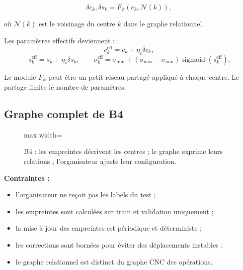 \documentclass[11pt,a4paper]{article}
\begin{document}
\[
\delta c_k,\delta s_k
=
F_\psi(e_k,\mathcal{N}(k)),
\]

où \(\mathcal{N}(k)\) est le voisinage du centre \(k\) dans le graphe
relationnel.

Les paramètres effectifs deviennent :
\[
c_k^{\mathrm{eff}}=c_k+\eta_c\delta c_k,
\]
\[
s_k^{\mathrm{eff}}=s_k+\eta_s\delta s_k,
\qquad
\sigma_k^{\mathrm{eff}}
=\sigma_{\min}
+(\sigma_{\max}-\sigma_{\min})
\operatorname{sigmoid}(s_k^{\mathrm{eff}}).
\]

Le module \(F_\psi\) peut être un petit réseau partagé appliqué
à chaque centre. Le partage limite le nombre de paramètres.

\subsection{Graphe complet de B4}

\begin{figure}[H]
\centering
\begin{adjustbox}{max width=\linewidth}
\end{adjustbox}
\caption{B4 : les empreintes décrivent les centres ; le graphe exprime
leurs relations ; l'organisateur ajuste leur configuration.}
\end{figure}

\textbf{Contraintes :}
\begin{itemize}
  \item l'organisateur ne reçoit pas les labels du test ;
  \item les empreintes sont calculées sur train et validation uniquement ;
  \item la mise à jour des empreintes est périodique et déterministe ;
  \item les corrections sont bornées pour éviter des déplacements instables ;
  \item le graphe relationnel est distinct du graphe CNC des opérations.
\end{itemize}
\end{document}
